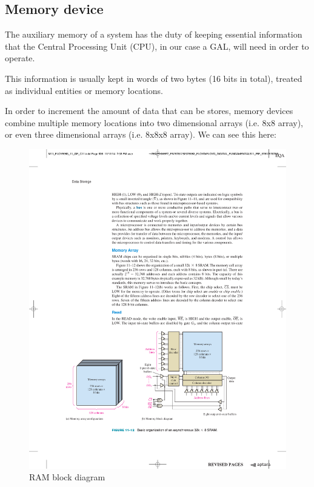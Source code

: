 
\subsection{Memory device}

The auxiliary memory of a system has the duty of keeping essential information that the Central Processing Unit (CPU), in our case a GAL, will need in order to operate.

\medskip
This information is usually kept in words of two bytes (16 bits in total), treated as individual entities or memory locations.


In order to increment the amount of data that can be stores, memory devices combine multiple memory locations into two dimensional arrays (i.e. 8x8 array), or even three dimensional arrays (i.e. 8x8x8 array). We can see this here:

\begin{figure}[H]
    \centering
    \includegraphics[scale = 0.85]{Graphics/RAM/RAM_BLOCK_DIAG.pdf}
    \caption{RAM block diagram ~\autocite{FLOYD}}
    \label{fig:RAM_BLOCK_DIAG}
\end{figure}


